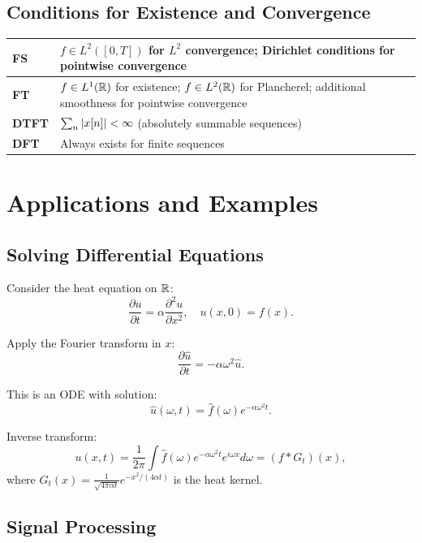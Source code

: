 \begin{notechapter}
\subsection{Conditions for Existence and Convergence}

\begin{center}
\begin{tabular}{|l|p{10cm}|}
\hline
\textbf{FS} & $f \in L^2([0,T])$ for $L^2$ convergence; Dirichlet conditions for pointwise convergence \\
\hline
\textbf{FT} & $f \in L^1(\mathbb{R})$ for existence; $f \in L^2(\mathbb{R})$ for Plancherel; additional smoothness for pointwise convergence \\
\hline
\textbf{DTFT} & $\sum_n \left|x[n]\right| < \infty$ (absolutely summable sequences) \\
\hline
\textbf{DFT} & Always exists for finite sequences \\
\hline
\end{tabular}
\end{center}

\section{Applications and Examples}

\subsection{Solving Differential Equations}

\begin{example}
Consider the heat equation on $\mathbb{R}$:
\[
\frac{\partial u}{\partial t} = \alpha \frac{\partial^2 u}{\partial x^2}, \quad u(x, 0) = f(x).
\]

Apply the Fourier transform in $x$:
\[
\frac{\partial \hat{u}}{\partial t} = -\alpha \omega^2 \hat{u}.
\]

This is an ODE with solution:
\[
\hat{u}(\omega, t) = \hat{f}(\omega) e^{-\alpha \omega^2 t}.
\]

Inverse transform:
\[
u(x, t) = \frac{1}{2\pi} \int \hat{f}(\omega) e^{-\alpha \omega^2 t} e^{i\omega x} d\omega = (f * G_t)(x),
\]
where $G_t(x) = \frac{1}{\sqrt{4\pi \alpha t}} e^{-x^2/(4\alpha t)}$ is the heat kernel.
\end{example}

\subsection{Signal Processing}


\end{notechapter}
